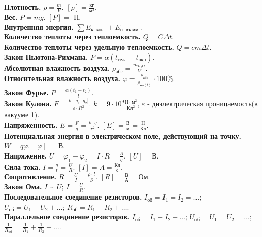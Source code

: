 \documentclass{article}
\begin{document}
	\tableofcontents
	\setcounter{tocdepth}{3}
	\newpage
	\noindent
	\textbf{Плотность.} $\rho = \frac{m}{V}$. $[\rho] = \frac{\text{кг}}{\text{м}^3}$. \\
	\textbf{Вес.} $P = mg$. $[P] =$ Н. \\
	\textbf{Внутренняя энергия.} $\sum E_{\text{к. мол.}} + E_{\text{п. взаим.}}$. \\
	\textbf{Количество теплоты через теплоемкость.} $Q = C \varDelta t$. \\
	\textbf{Количество теплоты через удельную теплоемкость.} $Q = c m \varDelta t$. \\
	\textbf{Закон Ньютона-Рихмана.} $P = \alpha (t_{\text{тела}} - t_{\text{окр}})$. \\
	\textbf{Абсолютная влажность воздуха.} $\rho_{\text{абс}} = \frac{m_{H_2O}}{V}$. \\
	\textbf{Относительная влажность воздуха.} $\varphi = \frac{\rho_{\text{абс}}}{\rho_{\text{нп}(t)}} \cdot 100\%$. \\
	\textbf{Закон Фурье.} $P = \frac{\alpha (t_1 - t_2)}{l}$. \\
	\textbf{Закон Кулона.} $F = \frac{k \cdot |q_{1} \cdot q_{2}|}{\varepsilon \cdot R^{2}}$. $k = 9 \cdot 10^{9} \frac{\text{Н} \cdot \text{м}^{2}}{\text{Кл}^{2}}$, $\varepsilon$ - диэлектрическая проницаемость(в вакууме 1). \\
	\textbf{Напряженность.} $E = \frac{F}{q} = \frac{k \cdot q}{r^{2}}$. $[E] = \frac{\text{В}}{\text{м}} = \frac{\text{Н}}{\text{Кл}}$. \\
	\textbf{Потенциальная энергия в электрическом поле, действующий на точку.} $W = q \varphi$. $[\varphi] =$ В. \\
	\textbf{Напряжение.} $U = \varphi_{1} - \varphi_{2} = I \cdot R = \frac{A}{q}$. $[U] = \text{В}$. \\
	\textbf{Сила тока.} $I = \frac{q}{t} = \frac{U}{R}$. $[I] = A = \frac{\text{Кл}}{\text{с}}$. \\
	\textbf{Сопротивление.} $R = \frac{U}{I} = \frac{\rho \cdot l}{S}$. $[R] = \frac{\text{В}}{\text{А}} = \text{Ом}$. \\
	\textbf{Закон Ома.} $I \sim U$; $I = \frac{U}{R}$. \\
	\textbf{Последовательное соединение резисторов.} $I_{\text{об}} = I_{1} = I_{2} = \dots$; $U_{\text{об}} = U_{1} + U_{2} + \dots$; $R_{\text{об}} = R_{1} + R_{2} + \dots$. \\
	\textbf{Параллельное соединение резисторов.} $I_{\text{об}} = I_{1} + I_{2} + \dots$; $U_{\text{об}} = U_{1} = U_{2} = \dots$; $\frac{1}{R_{\text{об}}} = \frac{1}{R_{1}} + \frac{1}{R_{2}} + \dots$. \\
\end{document}
